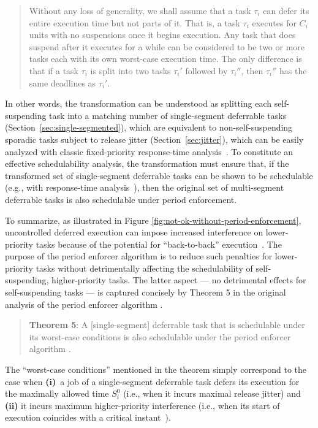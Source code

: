 \begin{quote}
	 Without any loss of generality, we shall assume that a task $\tau_i$ can defer its entire execution time but not parts of it. That is, a task $\tau_i$ executes for $C_i$ units with no suspensions once it begins execution. Any task that does suspend after it executes for a while can be considered to be two or more tasks each with its own worst-case execution time. The only difference is that if a task $\tau_i$ is split into two tasks $\tau_i'$ followed by $\tau_i''$, then $\tau_i''$ has the same deadlines as $\tau_i{{'}}$. 
\end{quote}
%
In other words, the transformation can be understood as splitting each self-suspending task into a matching number of single-segment deferrable tasks (Section~\ref{sec:single-segmented}), which are equivalent to non-self-suspending sporadic tasks subject to release jitter (Section~\ref{sec:jitter}), which can be easily analyzed with classic fixed-priority response-time analysis~\cite{ABRTW:93}. To constitute an effective schedulability analysis, the transformation must ensure that, if the transformed set of single-segment deferrable tasks can be shown to be schedulable (e.g., with response-time analysis~\cite{ABRTW:93}), then the original set of multi-segment deferrable tasks is also schedulable under period enforcement.

To summarize, as illustrated in Figure \ref{fig:not-ok-without-period-enforcement},
uncontrolled deferred execution can impose  increased interference on lower-priority tasks because of the potential for ``back-to-back'' execution~\cite{LSS:87,LSST:91,Ra:90,ABRTW:93,SLS:95}. The purpose of the period enforcer algorithm is to reduce such penalties for lower-priority tasks without detrimentally affecting the schedulability of self-suspending, higher-priority tasks. The latter aspect --- no detrimental effects for self-suspending tasks --- is captured concisely by Theorem 5 in the original analysis of the period enforcer algorithm \cite{Raj:suspension1991}.
\begin{quote}
{\bf Theorem 5}: A [single-segment] deferrable task that is schedulable under its worst-case conditions is also schedulable under the period enforcer algorithm \cite{Raj:suspension1991}. 
\end{quote}
The ``worst-case conditions'' mentioned in the theorem simply correspond to the case when \textbf{(i)}~a job of a single-segment deferrable task defers its execution for the maximally allowed time $S_i^0$ (i.e., when it incurs maximal release jitter) and \textbf{(ii)} it incurs maximum higher-priority interference (i.e., when its start of execution coincides with a critical instant~\cite{LL:73}).


